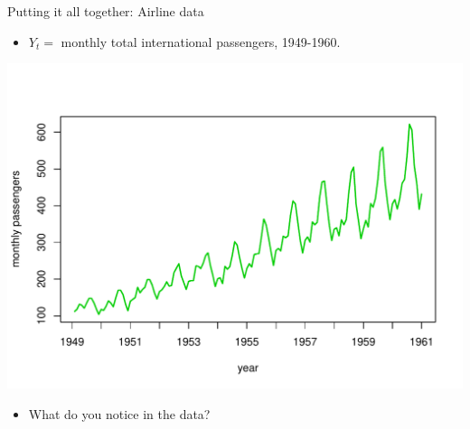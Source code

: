 \documentclass[12pt,xcolor=svgnames]{beamer}
\newcommand{\bl}{\color{blue}}
\newcommand{\nochap}{\vspace{0.5cm}}
\newcommand{\nsk}{\vspace{-.4cm}}
\begin{document}
\begin{frame}
\nochap

\vspace{-0.15cm}
{\bl Putting it all together:} Airline data
\begin{itemize}
\item $Y_t = $ monthly total international passengers, 1949-1960.
\end{itemize}

\begin{center}
\includegraphics[scale=0.5,trim=10 20 0 60]{airline_new}
\end{center}

\nsk
\begin{itemize}
\item  {\bl What do you notice in the data?} %
\end{itemize}

\end{frame}
\end{document}
